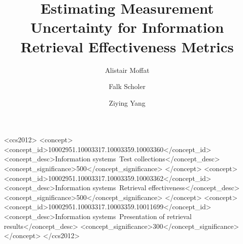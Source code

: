\documentclass[acmsmall,review=true,anonymous=true]{acmart}
\begin{document}
\title[Estimating Measurement Uncertainty]%
{Estimating Measurement Uncertainty for Information Retrieval Effectiveness Metrics}


\author{Alistair Moffat}

\author{Falk Scholer}


\author{Ziying Yang} 




%
%
\begin{CCSXML}
<ccs2012>
<concept>
<concept_id>10002951.10003317.10003359.10003360</concept_id>
<concept_desc>Information systems~Test collections</concept_desc>
<concept_significance>500</concept_significance>
</concept>
<concept>
<concept_id>10002951.10003317.10003359.10003362</concept_id>
<concept_desc>Information systems~Retrieval effectiveness</concept_desc>
<concept_significance>500</concept_significance>
</concept>
<concept>
<concept_id>10002951.10003317.10003359.10011699</concept_id>
<concept_desc>Information systems~Presentation of retrieval results</concept_desc>
<concept_significance>300</concept_significance>
</concept>
</ccs2012>
\end{CCSXML}


%
%


\end{document}
